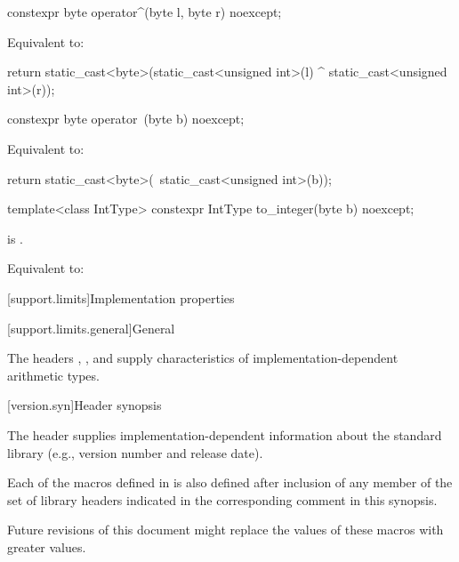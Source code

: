 %
\begin{itemdecl}
constexpr byte operator^(byte l, byte r) noexcept;
\end{itemdecl}

\begin{itemdescr}
\pnum
\effects
Equivalent to:
\begin{codeblock}
return static_cast<byte>(static_cast<unsigned int>(l) ^ static_cast<unsigned int>(r));
\end{codeblock}
\end{itemdescr}

%
\begin{itemdecl}
constexpr byte operator~(byte b) noexcept;
\end{itemdecl}

\begin{itemdescr}
\pnum
\effects
Equivalent to:
\begin{codeblock}
return static_cast<byte>(~static_cast<unsigned int>(b));
\end{codeblock}
\end{itemdescr}

%
\begin{itemdecl}
template<class IntType>
  constexpr IntType to_integer(byte b) noexcept;
\end{itemdecl}

\begin{itemdescr}
\pnum
\constraints
{} is .

\pnum
\effects
Equivalent to: 
\end{itemdescr}

[support.limits]{Implementation properties}

[support.limits.general]{General}

\pnum
The headers
,
, and
supply characteristics of
%
imple\-mentation-dependent
arithmetic types.

[version.syn]{Header  synopsis}

\pnum
The header 
supplies implementation-dependent information
about the \Cpp{} standard library
(e.g., version number and release date).

\pnum
{}%
Each of the macros defined in  is also defined
after inclusion of any member of the set of library headers
indicated in the corresponding comment in this synopsis.
\begin{note}
Future revisions of this document might replace
the values of these macros with greater values.
\end{note}

